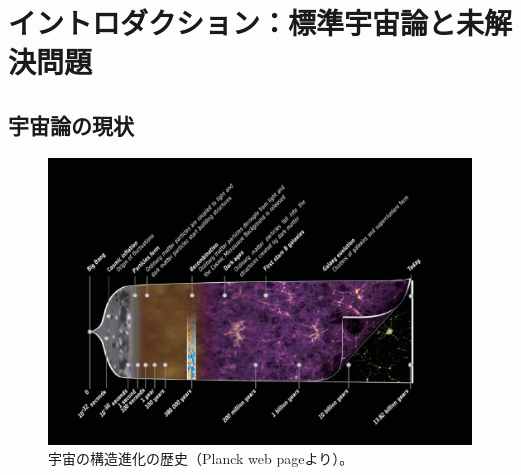 \section{イントロダクション：標準宇宙論と未解決問題}\label{cosmology.s1}

\subsection{宇宙論の現状}\label{cosmology.s1.ss1}

\begin{figure}[t]
\begin{center}
\includegraphics[width=0.8\linewidth]{cosmology/Planck_history_of_Universe_Crop_orig.eps} 
\caption{宇宙の構造進化の歴史（Planck web pageより）。}\label{fig:cosmo_history}
\end{center}


\end{figure}
